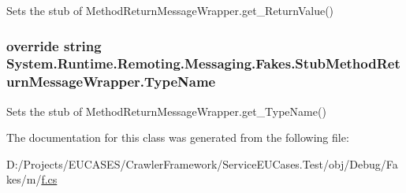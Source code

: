Sets the stub of Method\-Return\-Message\-Wrapper.\-get\-\_\-\-Return\-Value()

\hypertarget{class_system_1_1_runtime_1_1_remoting_1_1_messaging_1_1_fakes_1_1_stub_method_return_message_wrapper_a64f9403112a2a4524ebdfe776ded47b6}{
\subsubsection[{Type\-Name}]{\setlength{\rightskip}{0pt plus 5cm}override string System.\-Runtime.\-Remoting.\-Messaging.\-Fakes.\-Stub\-Method\-Return\-Message\-Wrapper.\-Type\-Name\hspace{0.3cm}{\ttfamily [get]}}}\label{class_system_1_1_runtime_1_1_remoting_1_1_messaging_1_1_fakes_1_1_stub_method_return_message_wrapper_a64f9403112a2a4524ebdfe776ded47b6}


Sets the stub of Method\-Return\-Message\-Wrapper.\-get\-\_\-\-Type\-Name()



The documentation for this class was generated from the following file\-:\begin{DoxyCompactItemize}
\item 
D\-:/\-Projects/\-E\-U\-C\-A\-S\-E\-S/\-Crawler\-Framework/\-Service\-E\-U\-Cases.\-Test/obj/\-Debug/\-Fakes/m/\hyperlink{m_2f_8cs}{f.\-cs}\end{DoxyCompactItemize}
